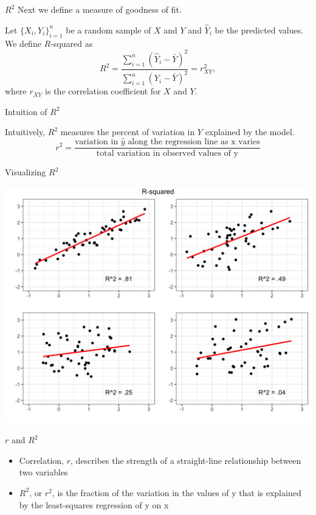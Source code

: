 \documentclass{beamer}
\begin{document}
	
\begin{frame}{$R^2$}
	Next we define a measure of goodness of fit.
	\begin{definition}[$R^2$]
		Let $\{X_i,Y_i\}_{i=1}^n$ be a random sample of $X$ and $Y$ and $\widehat{Y}_i$ be the predicted values. We define $R$-squared as
		\[ R^2 = \frac{\sum_{i=1}^n\left(\widehat{Y}_i - \bar{Y}\right)^2}{\sum_{i=1}^n\left(Y_i - \bar{Y}\right)^2} = r_{XY}^2, \]
		where $r_{XY}$ is the correlation coefficient for $X$ and $Y$.
	\end{definition}
\end{frame}
\begin{frame}{Intuition of $R^2$}
	
	Intuitively, $R^2$ measures the percent of variation in $Y$ explained by the model.
	$$r^2=\frac{\text{variation in } \hat{y} \text{ along the regression line as x varies}}{\text{total variation in observed values of y}}$$
	
\end{frame}
\begin{frame}{Visualizing $R^2$}
	\begin{center}
		\includegraphics[width=.8\textwidth]{Rsquaredcomparisons.png}
	\end{center}
\end{frame}



\begin{frame}{$r$ and $R^2$}
	
	\begin{itemize}
		\item Correlation, $r$, describes the strength of a straight-line relationship between two variables
		      
		\item $R^2$, or $r^2$, is the fraction of the variation in the values of y that is explained by the least-squares regression of y on x
	\end{itemize}
	
\end{frame}
\end{document}
